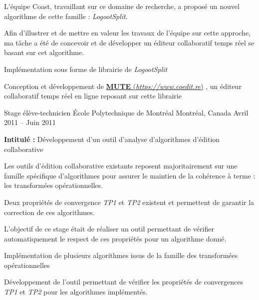 \documentclass[12pt, a4paper]{awesome-cv}
\newcommand{\customlink}[2]{
  \href{#2}{\textbf{#1} (\emph{#2})}
}
\begin{document}
\begin{cventries}
\begin{cvparagraph}
    L'équipe Coast, travaillant sur ce domaine de recherche, a proposé un nouvel algorithme de cette famille : \emph{LogootSplit}.

    Afin d'illustrer et de mettre en valeur les travaux de l'équipe sur cette approche,
    ma tâche a été de concevoir et de développer un éditeur collaboratif temps réel se basant sur cet algorithme.

    \begin{tightemize}
      \item Implémentation sous forme de librairie de \emph{LogootSplit}
      \item Conception et développement de \customlink{MUTE}{https://www.coedit.re}, un éditeur collaboratif temps réel en ligne reposant sur cette librairie
    \end{tightemize}
  \end{cvparagraph}

\cventry
  {Stage élève-technicien} %
  {École Polytechnique de Montréal} %
  {Montréal, Canada} %
  {Avril 2011 – Juin 2011} %
  {
    \begin{cvitems} %
      \item {\textbf{Intitulé :}  Développement d’un outil d'analyse d'algorithmes d'édition collaborative}
    \end{cvitems}
  }

\begin{cvparagraph}
  Les outils d'édition collaborative existants reposent majoritairement sur une famille spécifique d'algorithmes pour assurer le maintien de la cohérence à terme : les transformées opérationnelles.

  Deux propriétés de convergence \emph{TP1} et \emph{TP2} existent et permettent de garantir la correction de ces algorithmes.

  L'objectif de ce stage était de réaliser un outil permettant de vérifier automatiquement le respect de ces propriétés pour un algorithme donné.
  \begin{tightemize}
    \item Implémentation de plusieurs algorithmes issus de la famille des transformées opérationnelles
    \item Développement de l'outil permettant de vérifier les propriétés de convergences \emph{TP1} et \emph{TP2} pour les algorithmes implémentés.
  \end{tightemize}
\end{cvparagraph}

\end{cventries}
\end{document}
